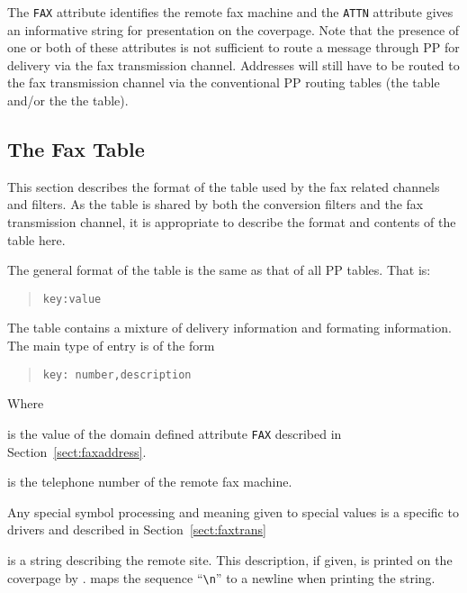 The \verb+FAX+ attribute identifies the remote fax machine and the
\verb+ATTN+ attribute gives an informative string for presentation on
the coverpage.
Note that the presence of one or both of these attributes is not
sufficient to route a message through PP for delivery via the fax
transmission channel.
Addresses will still have to be routed to the fax transmission
channel via the conventional PP routing tables (the  table
and/or the the  table).

\subsection {The Fax Table} \label{sect:faxtable}

This section describes the format of the table used by the fax related
channels and filters.
As the table is shared by both the conversion filters and the
fax transmission channel, it is appropriate to describe the format and
contents of the table here.

The general format of the table is the same as that of all PP tables.
That is:
\begin{quote}\begin{verbatim}
key:value
\end{verbatim}\end{quote}

The table contains a mixture of delivery information and formating
information.
The main type of entry is of the form
\begin{quote}\begin{verbatim}
key: number,description
\end{verbatim}\end{quote}
Where
\begin{describe}

\item[\verb+key+:] is the value of the domain defined attribute
\verb+FAX+ described in Section~\ref{sect:faxaddress}.

\item[\verb+number+:] is the telephone number of the remote fax
machine.

Any special symbol processing and meaning given to special values is a
specific to drivers and described in Section~\ref{sect:faxtrans}

\item[\verb+description+:] is a string describing the remote site.
This description, if given, is printed on the coverpage by
.
 maps the sequence ``\verb+\n+'' to a newline when printing
the string.
\end{describe}

